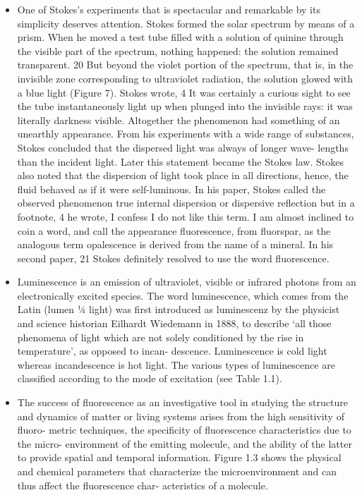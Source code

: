 \begin{enumerate}
\begin{itemize}
        \item One of Stokes’s experiments that is spectacular and remarkable by its simplicity deserves attention. Stokes formed the solar spectrum by means of a prism. When he moved a test tube filled with a solution of quinine through the visible part of the spectrum, nothing happened: the solution remained transparent. 20 But beyond the violet portion of the spectrum, that is, in the invisible zone corresponding to ultraviolet radiation, the solution glowed with a blue light (Figure 7). Stokes wrote, 4 It was certainly a curious sight to see the tube instantaneously light up when plunged into the invisible rays: it was literally darkness visible. Altogether the phenomenon had something of an unearthly appearance. From his experiments with a wide range of substances, Stokes concluded that the dispersed light was always of longer wave- lengths than the incident light. Later this statement became the Stokes law. Stokes also noted that the dispersion of light took place in all directions, hence, the fluid behaved as if it were self-luminous. In his paper, Stokes called the observed phenomenon true internal dispersion or dispersive reflection but in a footnote, 4 he wrote, I confess I do not like this term. I am almost inclined to coin a word, and call the appearance fluorescence, from fluorspar, as the analogous term opalescence is derived from the name of a mineral. In his second paper, 21 Stokes definitely resolved to use the word fluorescence.
        \item Luminescence is an emission of ultraviolet, visible or infrared photons from an electronically excited species. The word luminescence, which comes from the Latin (lumen ¼ light) was ﬁrst introduced as luminescenz by the physicist and science historian Eilhardt Wiedemann in 1888, to describe ‘all those phenomena of light which are not solely conditioned by the rise in temperature’, as opposed to incan- descence. Luminescence is cold light whereas incandescence is hot light. The various types of luminescence are classiﬁed according to the mode of excitation (see Table 1.1).
        \item The success of ﬂuorescence as an investigative tool in studying the structure and dynamics of matter or living systems arises from the high sensitivity of ﬂuoro- metric techniques, the speciﬁcity of ﬂuorescence characteristics due to the micro- environment of the emitting molecule, and the ability of the latter to provide spatial and temporal information. Figure 1.3 shows the physical and chemical parameters that characterize the microenvironment and can thus aﬀect the ﬂuorescence char- acteristics of a molecule.

\end{itemize}
\end{enumerate}
